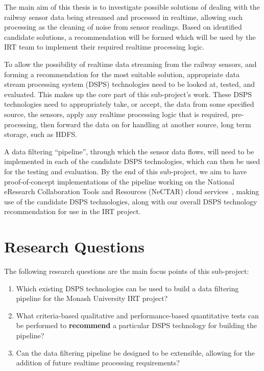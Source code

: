 The main aim of this thesis is to investigate possible solutions of dealing with the railway sensor data being
streamed and processed in realtime, allowing such processing as the cleaning of noise from sensor readings. Based on identified
candidate solutions, a recommendation will be formed which will be used by the IRT team to implement their required realtime processing logic.

To allow the possibility of realtime data streaming from the railway sensors, and forming a recommendation for the most
suitable solution, appropriate data stream processing system
(DSPS) technologies need to be looked at, tested, and evaluated. This makes up the core part of this sub-project's work.
These DSPS technologies need to appropriately take, or accept, the data from some specified source, \eg the sensors, apply
any realtime processing logic that is required, \eg pre-processing, then forward the data on for handling at
another source, \eg long term storage, such as HDFS.

A data filtering ``pipeline'', through which the sensor data flows, will need to be implemented in each of the candidate
DSPS technologies, which can then be used for the testing and evaluation.
By the end of this sub-project, we aim to have proof-of-concept implementations of the pipeline working on the National
eResearch Collaboration Tools and Resources (NeCTAR) cloud services~\cite{web:Nectar}, making use of the candidate DSPS
technologies, along with our overall DSPS technology recommendation for use in the IRT project.




\section{Research Questions} %
\label{sub:research_questions}

The following research questions are the main focus points of this sub-project:

\begin{enumerate}
  \item\label{item:dsps} Which existing DSPS technologies can be used to build a data filtering pipeline for the Monash
  University IRT project?
  \item\label{item:pipeline} What criteria-based qualitative and performance-based quantitative tests can be performed
  to \textbf{recommend} a particular DSPS technology for building the pipeline?
  \item\label{item:recommendations} Can the data filtering pipeline be designed to be extensible, allowing for the
  addition of future realtime processing requirements?
\end{enumerate}

